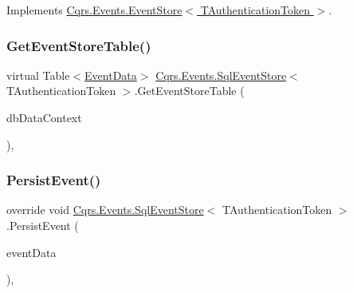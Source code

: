 Implements \hyperlink{classCqrs_1_1Events_1_1EventStore_a0096646f5dff730b0041b9469719c420_a0096646f5dff730b0041b9469719c420}{Cqrs.\+Events.\+Event\+Store$<$ T\+Authentication\+Token $>$}.

\mbox{\label{classCqrs_1_1Events_1_1SqlEventStore_a6daa6c32874ab593d0d8a54c90d219c6_a6daa6c32874ab593d0d8a54c90d219c6}} 
\subsubsection{\texorpdfstring{Get\+Event\+Store\+Table()}{GetEventStoreTable()}}
{\footnotesize\ttfamily virtual Table$<$\hyperlink{classCqrs_1_1Events_1_1EventData}{Event\+Data}$>$ \hyperlink{classCqrs_1_1Events_1_1SqlEventStore}{Cqrs.\+Events.\+Sql\+Event\+Store}$<$ T\+Authentication\+Token $>$.Get\+Event\+Store\+Table (\begin{DoxyParamCaption}\item[{Data\+Context}]{db\+Data\+Context }\end{DoxyParamCaption})\hspace{0.3cm}{\ttfamily [protected]}, {\ttfamily [virtual]}}

\mbox{\label{classCqrs_1_1Events_1_1SqlEventStore_a8d67570d50a97050cbce5a29d7a4b9f6_a8d67570d50a97050cbce5a29d7a4b9f6}} 
\subsubsection{\texorpdfstring{Persist\+Event()}{PersistEvent()}}
{\footnotesize\ttfamily override void \hyperlink{classCqrs_1_1Events_1_1SqlEventStore}{Cqrs.\+Events.\+Sql\+Event\+Store}$<$ T\+Authentication\+Token $>$.Persist\+Event (\begin{DoxyParamCaption}\item[{\hyperlink{classCqrs_1_1Events_1_1EventData}{Event\+Data}}]{event\+Data }\end{DoxyParamCaption})\hspace{0.3cm}{\ttfamily [protected]}, {\ttfamily [virtual]}}



